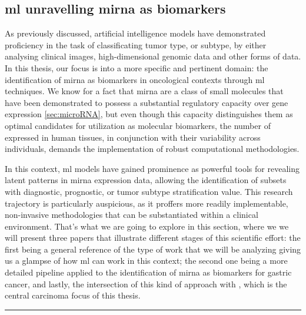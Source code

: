 \subsection{\gls{ml} unravelling \gls{mirna} as biomarkers}

As previously discussed, artificial intelligence models have demonstrated
proficiency in the task of classificating tumor type, or subtype, by either
analysing clinical images, high-dimensional genomic data and other forms of
data. In this thesis, our focus is into a more specific and pertinent domain:
the identification of \gls{mirna} as biomarkers in oncological contexts through
\gls{ml} techniques. We know for a fact that \gls{mirna} are a class of small
molecules that have been demonstrated to possess a substantial regulatory
capacity over gene expression \ref{sec:microRNA}, but even though this capacity
distinguishes them as optimal candidates for utilization as molecular
biomarkers, the number of  expressed in human tissues, in
conjunction with their variability across individuals, demands the
implementation of robust computational methodologies.

In this context, \gls{ml} models have gained prominence as powerful tools for
revealing latent patterns in \gls{mirna} expression data, allowing the
identification of subsets with diagnostic, prognostic, or tumor subtype
stratification value. This research trajectory is particularly auspicious, as
it proffers more readily implementable, non-invasive methodologies that can be
substantiated within a clinical environment. That's what we are going to
explore in this section, where we we will present three papers that illustrate
different stages of this scientific effort: the first being a general reference
of the type of work that we will be analyzing giving us a glampse of how
\gls{ml} can work in this context; the second one being a more detailed
pipeline applied to the identification of \gls{mirna} as biomarkers for gastric
cancer, and lastly, the intersection of this kind of approach with
, which is the central carcinoma focus of this thesis.

\noindent\rule{\linewidth}{0.4pt}

